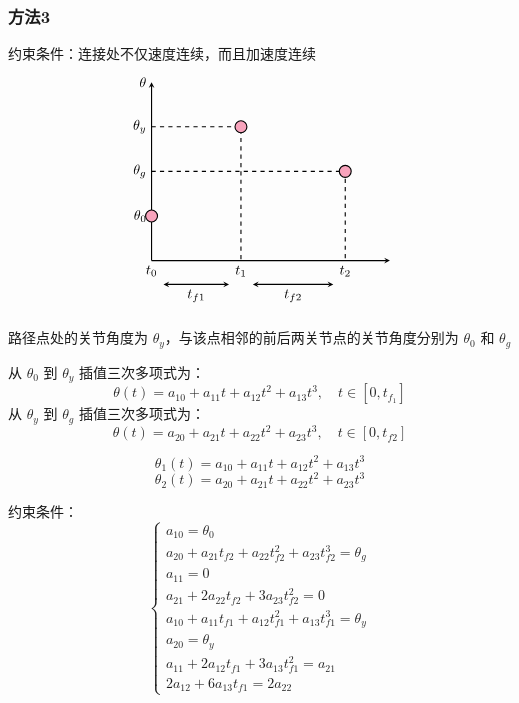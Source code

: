 \subsubsection{方法3}
约束条件：连接处不仅速度连续，而且\textcolor{whusakura}{加速度连续}
$$
\begin{tikzpicture}[>=stealth, scale=0.75]
    \def\tzero{0}
    \def\tone{3}
    \def\ttwo{6.5}
    \def\thzero{1.5}
    \def\thg{3}
    \def\thy{4.5}
    \draw[->, thick] (0,0) -- (8,0);
    \draw[->, thick] (0,0) -- (0,6) node[left] {$\theta$};
    \draw[dashed, thick] (0,\thy) node[left, text=black] {$\theta_y$} -- (\tone,\thy) -- (\tone,0) node[below, text=black] {$t_1$};
    \draw[dashed, thick] (0,\thg) node[left, text=black] {$\theta_g$} -- (\ttwo,\thg) -- (\ttwo,0) node[below, text=black] {$t_2$};
    \node[left] at (0,\thzero) {$\theta_0$};
    \node[below] at (0,0) {$t_0$};
    \filldraw[fill=whusakura, thick] (\tzero,\thzero) circle (0.2cm);
    \filldraw[fill=whusakura, thick] (\tone,\thy) circle (0.2cm);
    \filldraw[fill=whusakura, thick] (\ttwo,\thg) circle (0.2cm);
    \draw[<->, thick] (0.4, -0.8) -- (\tone - 0.4, -0.8) node[midway, below] {$t_{f1}$};
    \draw[<->, thick] (\tone + 0.4, -0.8) -- (\ttwo - 0.4, -0.8) node[midway, below] {$t_{f2}$};
\end{tikzpicture}
$$

路径点处的关节角度为 $\theta_y$，与该点相邻的前后两关节点的关节角度分别为 $\theta_0$ 和 $\theta_g$

从 $\theta_0$ 到 $\theta_y$ 插值三次多项式为：
$$\theta(t) = a_{10} + a_{11}t + a_{12}t^{2} + a_{13}t^{3}, \quad t \in \left[0, t_{f_1}\right]$$
从 $\theta_y$ 到 $\theta_g$ 插值三次多项式为：
$$\theta(t) = a_{20} + a_{21}t + a_{22}t^{2} + a_{23}t^{3}, \quad t \in \left[0, t_{f2}\right]$$

$$\theta_1(t) = a_{10} + a_{11}t + a_{12}t^2 + a_{13}t^3$$
$$\theta_2(t) = a_{20} + a_{21}t + a_{22}t^2 + a_{23}t^3$$

约束条件：
$$
\begin{cases}
a_{10} = \theta_0 \\
a_{20} + a_{21}t_{f2} + a_{22}t_{f2}^2 + a_{23}t_{f2}^3 = \theta_g \\
a_{11} = 0 \\
a_{21} + 2a_{22}t_{f2} + 3a_{23}t_{f2}^2 = 0 \\
a_{10} + a_{11}t_{f1} + a_{12}t_{f1}^2 + a_{13}t_{f1}^3 = \theta_y \\
a_{20} = \theta_y \\
a_{11} + 2a_{12}t_{f1} + 3a_{13}t_{f1}^2 = a_{21} \\
2a_{12} + 6a_{13}t_{f1} = 2a_{22}
\end{cases}
$$

